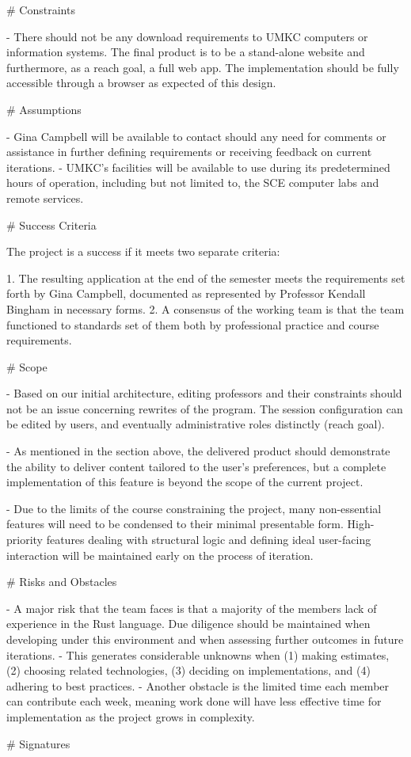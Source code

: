 \documentclass{article}
\begin{document}
\begin{markdown}
# Constraints

- There should not be any download requirements to UMKC computers or information systems.  The final product is to be a stand-alone website and furthermore, as a reach goal, a full web app. The implementation should be fully accessible through a browser as expected of this design.


# Assumptions

- Gina Campbell will be available to contact should any need for comments or assistance in further defining requirements or receiving feedback on current iterations.
- UMKC's facilities will be available to use during its predetermined hours of operation, including but not limited to, the SCE computer labs and remote services.

# Success Criteria

The project is a success if it meets two separate criteria:

 1. The resulting application at the end of the semester meets the requirements set forth by Gina Campbell, documented as represented by Professor Kendall Bingham in necessary forms.
 2. A consensus of the working team is that the team functioned to standards set of them both by professional practice and course requirements.

# Scope

- Based on our initial architecture, editing professors and their constraints should not be an issue concerning rewrites of the program. The session configuration can be edited by users, and eventually administrative roles distinctly (reach goal).

- As mentioned in the section above, the delivered product should demonstrate the ability to deliver content tailored to the user’s preferences, but a complete implementation of this feature is beyond the scope of the current project.

- Due to the limits of the course constraining the project, many non-essential features will need to be condensed to their minimal presentable form. High-priority features dealing with structural logic and defining ideal user-facing interaction will be maintained early on the process of iteration. 

# Risks and Obstacles

- A major risk that the team faces is that a majority of the members lack of experience in the Rust language. Due diligence should be maintained when developing under this environment and when assessing further outcomes in future iterations.
- This generates considerable unknowns when (1) making estimates, (2) choosing related technologies, (3) deciding on implementations, and (4) adhering to best practices.
- Another obstacle is the limited time each member can contribute each week, meaning work done will have less effective time for implementation as the project grows in complexity.

# Signatures

\end{markdown}
\end{document}
